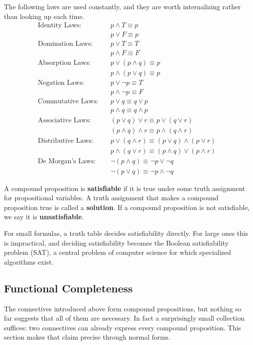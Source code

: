 The following laws are used constantly, and they are worth internalizing rather than looking up each time.
\begin{align*}
    \text{Identity Laws:} \quad & p \wedge T \equiv p \\
    & p \vee F \equiv p \\
    \text{Domination Laws:} \quad & p \vee T \equiv T \\
    & p \wedge F \equiv F \\
    \text{Absorption Laws:} \quad & p \vee (p \wedge q) \equiv p \\
    & p \wedge (p \vee q) \equiv p \\
    \text{Negation Laws:} \quad & p \vee \neg p \equiv T \\
    & p \wedge \neg p \equiv F \\
    \text{Commutative Laws:} \quad & p \vee q \equiv q \vee p \\
    & p \wedge q \equiv q \wedge p \\
    \text{Associative Laws:} \quad & (p \vee q) \vee r \equiv p \vee (q \vee r) \\
    & (p \wedge q) \wedge r \equiv p \wedge (q \wedge r) \\
    \text{Distributive Laws:} \quad & p \vee (q \wedge r) \equiv (p \vee q) \wedge (p \vee r) \\
    & p \wedge (q \vee r) \equiv (p \wedge q) \vee (p \wedge r) \\
    \text{De Morgan’s Laws:} \quad & \neg(p \wedge q) \equiv \neg p \vee \neg q \\
    & \neg(p \vee q) \equiv \neg p \wedge \neg q
\end{align*}

\begin{definition}[Satisfiability]
A compound proposition is \textbf{satisfiable} if it is true under some truth assignment for propositional variables. A truth assignment that makes a compound proposition true is called a \textbf{solution}. If a compound proposition is not satisfiable, we say it is \textbf{unsatisfiable}.
\end{definition}

For small formulas, a truth table decides satisfiability directly. For large ones this is impractical, and deciding satisfiability becomes the Boolean satisfiability problem (SAT), a central problem of computer science for which specialized algorithms exist.

\subsection{Functional Completeness}
The connectives introduced above form compound propositions, but nothing so far suggests that all of them are necessary. In fact a surprisingly small collection suffices: two connectives can already express every compound proposition. This section makes that claim precise through normal forms.

